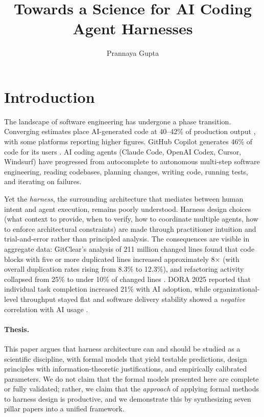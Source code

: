 \documentclass[11pt, a4paper, logo, copyright]{googledeepmind}
\title{Towards a Science for AI Coding Agent Harnesses}
\author[1]{Prannaya Gupta}
\begin{document}
\maketitle

\section{Introduction}
\label{sec:intro}

The landscape of software engineering has undergone a phase transition. Converging estimates place AI-generated code at 40--42\% of production output \citep{gitclear2025, sonar2026}, with some platforms reporting higher figures. GitHub Copilot generates 46\% of code for its users \citep{github2024rct}. AI coding agents (Claude Code, OpenAI Codex, Cursor, Windsurf) have progressed from autocomplete to autonomous multi-step software engineering, reading codebases, planning changes, writing code, running tests, and iterating on failures.

Yet the \emph{harness}, the surrounding architecture that mediates between human intent and agent execution, remains poorly understood. Harness design choices (what context to provide, when to verify, how to coordinate multiple agents, how to enforce architectural constraints) are made through practitioner intuition and trial-and-error rather than principled analysis. The consequences are visible in aggregate data: GitClear's analysis of 211 million changed lines found that code blocks with five or more duplicated lines increased approximately 8$\times$ (with overall duplication rates rising from 8.3\% to 12.3\%), and refactoring activity collapsed from 25\% to under 10\% of changed lines \citep{gitclear2025}. DORA 2025 reported that individual task completion increased 21\% with AI adoption, while organizational-level throughput stayed flat and software delivery stability showed a \emph{negative} correlation with AI usage \citep{dora2025}.

\paragraph{Thesis.} This paper argues that harness architecture can and should be studied as a scientific discipline, with formal models that yield testable predictions, design principles with information-theoretic justifications, and empirically calibrated parameters. We do not claim that the formal models presented here are complete or fully validated; rather, we claim that the \emph{approach} of applying formal methods to harness design is productive, and we demonstrate this by synthesizing seven pillar papers into a unified framework.
\end{document}
